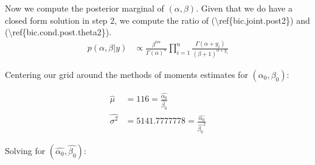 \documentclass[]{article}
\newenvironment{Shaded}{\begin{snugshade}}{\end{snugshade}}
\newcommand{\KeywordTok}[1]{\textcolor[rgb]{0.13,0.29,0.53}{\textbf{#1}}}
\newcommand{\DataTypeTok}[1]{\textcolor[rgb]{0.13,0.29,0.53}{#1}}
\newcommand{\DecValTok}[1]{\textcolor[rgb]{0.00,0.00,0.81}{#1}}
\newcommand{\StringTok}[1]{\textcolor[rgb]{0.31,0.60,0.02}{#1}}
\newcommand{\CommentTok}[1]{\textcolor[rgb]{0.56,0.35,0.01}{\textit{#1}}}
\newcommand{\ControlFlowTok}[1]{\textcolor[rgb]{0.13,0.29,0.53}{\textbf{#1}}}
\newcommand{\OperatorTok}[1]{\textcolor[rgb]{0.81,0.36,0.00}{\textbf{#1}}}
\newcommand{\NormalTok}[1]{#1}
\begin{document}
Now we compute the posterior marginal of \((\alpha,\beta)\). Given that
we do have a closed form solution in step 2, we compute the ratio of
(\textbackslash{}ref\{bic.joint.post2\}) and
(\textbackslash{}ref\{bic.cond.post.theta2\}). \[
\begin{aligned}
p(\alpha,\beta|y) &\propto \frac{\beta^{n\alpha}}{\Gamma(\alpha)^{n}} \prod_{i=1}^{n}\frac{\Gamma(\alpha+y_{i})}{(\beta + 1)^{\alpha+y_{i}}}
\label{bic.marg.post.phi}
\end{aligned}
\]

Centering our grid around the methods of moments estimates for
\((\alpha_{0}, \beta_{0})\):

\[
\begin{aligned}
\hat{\mu}     &= 116  = \frac{\hat{\alpha_{0}}}{\hat{\beta_{0}}}\\
\hat{\sigma^2} &= 5141.7777778 = \frac{\hat{\alpha_{0}}}{\hat{\beta_{0}}^2}
\end{aligned}
\]

Solving for \((\hat{\alpha_{0}},\hat{\beta_{0}})\):

\begin{Shaded}
\end{Shaded}
\end{document}
